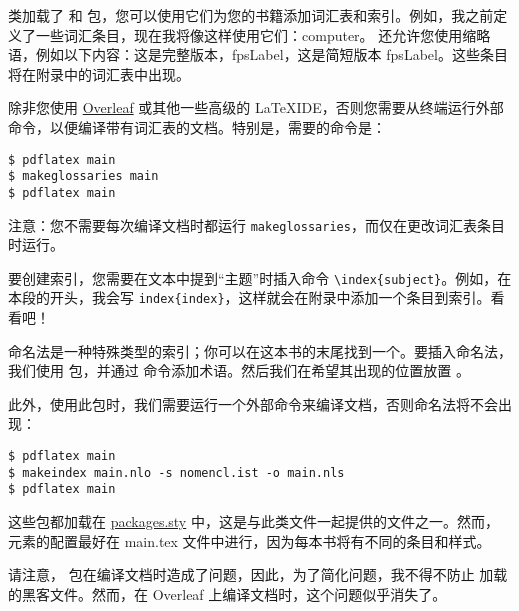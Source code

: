 类加载了  和  包，您可以使用它们为您的书籍添加词汇表和索引。例如，我之前定义了一些词汇条目，现在我将像这样使用它们：\gls{computer}。  还允许您使用缩略语，例如以下内容：这是完整版本，\acrfull{fpsLabel}，这是简短版本 \acrshort{fpsLabel}。这些条目将在附录中的词汇表中出现。

除非您使用 \href{https://www.overleaf.com}{Overleaf} 或其他一些高级的 \LaTeX IDE，否则您需要从终端运行外部命令，以便编译带有词汇表的文档。特别是，需要的命令是：

\begin{lstlisting}[style=kaolstplain]
$ pdflatex main
$ makeglossaries main
$ pdflatex main
\end{lstlisting}

注意：您不需要每次编译文档时都运行 \texttt{makeglossaries}，而仅在更改词汇表条目时运行。


要创建索引，您需要在文本中提到“主题”时插入命令 \lstinline|\index{subject}|。例如，在本段的开头，我会写 \lstinline|index{index}|，这样就会在附录中添加一个条目到索引。看看吧！



命名法是一种特殊类型的索引；你可以在这本书的末尾找到一个。要插入命名法，我们使用  包，并通过  命令添加术语。然后我们在希望其出现的位置放置 。

此外，使用此包时，我们需要运行一个外部命令来编译文档，否则命名法将不会出现：

\begin{lstlisting}[style=kaolstplain]
$ pdflatex main
$ makeindex main.nlo -s nomencl.ist -o main.nls
$ pdflatex main
\end{lstlisting}

这些包都加载在 \href{style/packages.sty}{packages.sty} 中，这是与此类文件一起提供的文件之一。然而，元素的配置最好在 main.tex 文件中进行，因为每本书将有不同的条目和样式。

请注意， 包在编译文档时造成了问题，因此，为了简化问题，我不得不防止  加载  的黑客文件。然而，在 Overleaf 上编译文档时，这个问题似乎消失了。

